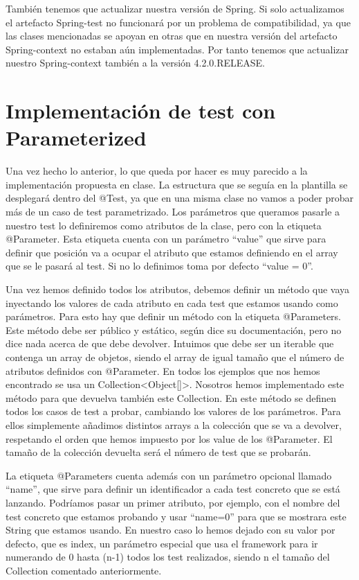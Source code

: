 \documentclass[a4paper]{article}
\begin{document}
También tenemos que actualizar nuestra versión de Spring. Si solo actualizamos el artefacto Spring-test no funcionará por un problema de compatibilidad, ya que las clases mencionadas se apoyan en otras que en nuestra versión del artefacto Spring-context no estaban aún implementadas. Por tanto tenemos que actualizar nuestro Spring-context también a la versión 4.2.0.RELEASE.

\section{Implementación de test con Parameterized}

Una vez hecho lo anterior, lo que queda por hacer es muy parecido a la implementación propuesta en clase. La estructura que se seguía en la plantilla se desplegará dentro del @Test, ya que en una misma clase no vamos a poder probar más de un caso de test parametrizado. Los parámetros que queramos pasarle a nuestro test lo definiremos como atributos de la clase, pero con la etiqueta @Parameter. Esta etiqueta cuenta con un parámetro ``value'' que sirve para definir que posición va a ocupar el atributo que estamos definiendo en el array que se le pasará al test. Si no lo definimos toma por defecto ``value = 0''.

Una vez hemos definido todos los atributos, debemos definir un método que vaya inyectando los valores de cada atributo en cada test que estamos usando como parámetros. Para esto hay que definir un método con la etiqueta @Parameters. Este método debe ser público y estático, según dice su documentación, pero no dice nada acerca de que debe devolver. Intuimos que debe ser un iterable que contenga un array de objetos, siendo el array de igual tamaño que el número de atributos definidos con @Parameter. En todos los ejemplos que nos hemos encontrado se usa un Collection\textless Object[]\textgreater . Nosotros hemos implementado este método para que devuelva también este Collection. En este método se definen todos los casos de test a probar, cambiando los valores de los parámetros. Para ellos simplemente añadimos distintos arrays a la colección que se va a devolver, respetando el orden que hemos impuesto por los value de los @Parameter. El tamaño de la colección devuelta será el número de test que se probarán.

La etiqueta @Parameters cuenta además con un parámetro opcional llamado ``name'', que sirve para definir un identificador a cada test concreto que se está lanzando. Podríamos pasar un primer atributo, por ejemplo, con el nombre del test concreto que estamos probando y usar ``name={0}'' para que se mostrara este String que estamos usando. En nuestro caso lo hemos dejado con su valor por defecto, que es {index}, un parámetro especial que usa el framework para ir numerando de 0 hasta (n-1) todos los test realizados, siendo n el tamaño del Collection comentado anteriormente. 
\end{document}
